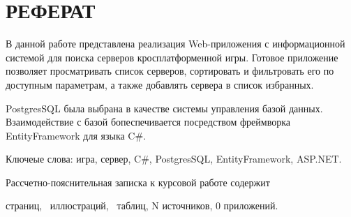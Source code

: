 \chapter*{РЕФЕРАТ}

В данной работе представлена реализация Web-приложения с информационной системой для поиска серверов кросплатформенной игры. Готовое приложение позволяет просматривать список серверов, сортировать и фильтровать его по доступным параметрам, а также добавлять сервера в список избранных.

PostgresSQL была выбрана в качестве системы управления базой данных. Взаимодействие с базой бопеспечивается посредством фреймворка EntityFramework для языка C\#.

Ключеые слова: игра, сервер, C\#, PostgresSQL, EntityFramework, ASP.NET.

Рассчетно-пояснительная записка к курсовой работе содержит \begin{NoHyper}\pageref{LastPage}\end{NoHyper} страниц, \totfig~иллюстраций, \tottab~таблиц, N источников, 0 приложений. %
